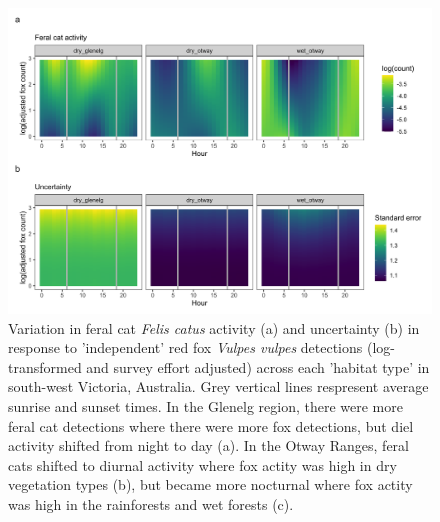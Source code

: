 \documentclass[11pt,a4paper,titlepage,twoside,openright]{style/unimelbthesis}
\begin{document}
\begin{mainmatter}
\begin{figure}
{\centering \includegraphics[width=1\linewidth]{figure/c4/cat_fox_count} 

}

\caption{Variation in feral cat \textit{Felis catus} activity (a) and uncertainty (b) in response to 'independent' red fox \textit{Vulpes vulpes} detections (log-transformed and survey effort adjusted) across each 'habitat type' in south-west Victoria, Australia. Grey vertical lines respresent average sunrise and sunset times. In the Glenelg region, there were more feral cat detections where there were more fox detections, but diel activity shifted from night to day (a). In the Otway Ranges, feral cats shifted to diurnal activity where fox actity was high in dry vegetation types (b), but became more nocturnal where fox actity was high in the rainforests and wet forests (c).}\label{fig:diel-cat-fox}
\end{figure}
\newpage
\begin{figure}


\end{figure}
\end{mainmatter}
\end{document}
